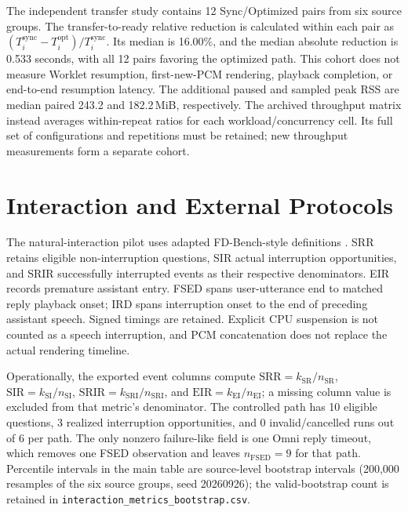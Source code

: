 The independent transfer study contains 12 Sync/Optimized pairs
from six source groups.
The transfer-to-ready relative reduction is calculated within each pair as
$(T_i^{\mathrm{sync}}-T_i^{\mathrm{opt}})/T_i^{\mathrm{sync}}$.
Its median is 16.00\%, and the median absolute reduction is
0.533 seconds, with all 12 pairs favoring the optimized path. This cohort
does not measure Worklet resumption, first-new-PCM rendering, playback
completion, or end-to-end resumption latency.
The additional paused and sampled peak RSS are median paired
243.2 and 182.2\,MiB, respectively.
The archived throughput matrix instead averages within-repeat
ratios for each workload/concurrency cell.
Its full set of configurations and repetitions must be retained;
new throughput measurements form a separate cohort.


\section{Interaction and External Protocols}
\label{app:interaction}

The natural-interaction pilot uses adapted FD-Bench-style definitions
\citep{fdbench2025}.
SRR retains eligible non-interruption questions, SIR actual
interruption opportunities, and SRIR successfully interrupted events
as their respective denominators.
EIR records premature assistant entry.
FSED spans user-utterance end to matched reply playback onset;
IRD spans interruption onset to the end of preceding assistant speech.
Signed timings are retained.
Explicit CPU suspension is not counted as a speech interruption,
and PCM concatenation does not replace the actual rendering timeline.

Operationally, the exported event columns compute
$\mathrm{SRR}=k_{\mathrm{SR}}/n_{\mathrm{SR}}$,
$\mathrm{SIR}=k_{\mathrm{SI}}/n_{\mathrm{SI}}$,
$\mathrm{SRIR}=k_{\mathrm{SRI}}/n_{\mathrm{SRI}}$, and
$\mathrm{EIR}=k_{\mathrm{EI}}/n_{\mathrm{EI}}$; a missing column value is
excluded from that metric's denominator. The controlled path has
10 eligible questions, 3 realized interruption opportunities, and
0 invalid/cancelled runs out of 6 per path. The only nonzero failure-like
field is one Omni reply timeout, which removes one FSED observation and
leaves $n_{\mathrm{FSED}}=9$ for that path. Percentile intervals in the
main table are source-level bootstrap intervals (200,000 resamples of the
six source groups, seed 20260926); the valid-bootstrap count is retained in
\texttt{interaction\_metrics\_bootstrap.csv}.

